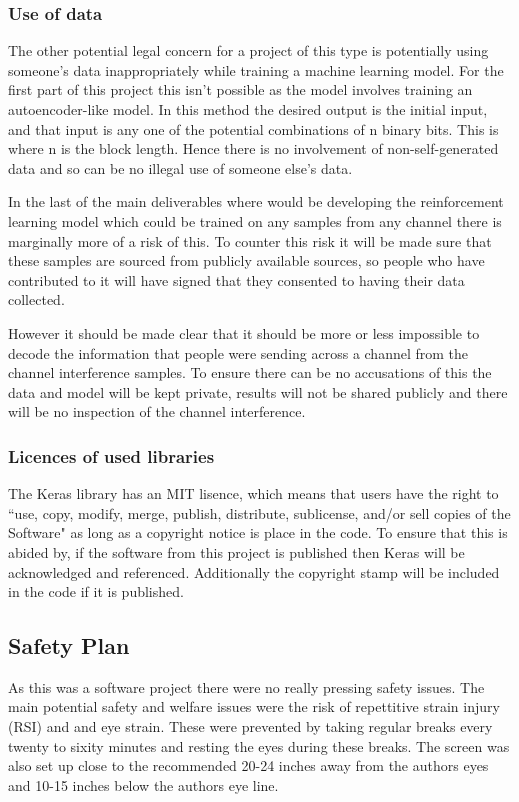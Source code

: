 \documentclass[12pt,onecolumn,letterpaper]{article}
\begin{document}
\subsubsection{Use of data}

The other potential legal concern for a project of this type is potentially using someone's data inappropriately while training a machine learning model. For the first part of this project this isn't possible as the model involves training an autoencoder-like model. In this method the desired output is the initial input, and that input is any one of the potential combinations of n binary bits. This is where n is the block length. Hence there is no involvement of non-self-generated data and so can be no illegal use of someone else's data.

In the last of the main deliverables where would be developing the reinforcement learning model which could be trained on any samples from any channel there is marginally more of a risk of this. To counter this risk it will be made sure that these samples are sourced from publicly available sources, so people who have contributed to it will have signed that they consented to having their data collected. 

However it should be made clear that it should be more or less impossible to decode the information that people were sending across a channel from the channel interference samples. To ensure there can be no accusations of this the data and model will be kept private, results will not be shared publicly and there will be no inspection of the channel interference.

\subsubsection{Licences of used libraries}

The Keras library has an MIT lisence, which means that users have the right to ``use, copy, modify, merge, publish, distribute, sublicense, and/or sell copies of the Software" as long as a copyright notice is place in the code. To ensure that this is abided by, if the software from this project is published then Keras will be acknowledged and referenced. Additionally the copyright stamp will be included in the code if it is published. 

\subsection{Safety Plan}

As this was a software project there were no really pressing safety issues. The main potential safety and welfare issues were the risk of repettitive strain injury (RSI) and and eye strain. These were prevented by taking regular breaks every twenty to sixity minutes and resting the eyes during these breaks. The screen was also set up close to the recommended 20-24 inches away from the authors eyes and 10-15 inches below the authors eye line.

{\small


}
\end{document}
